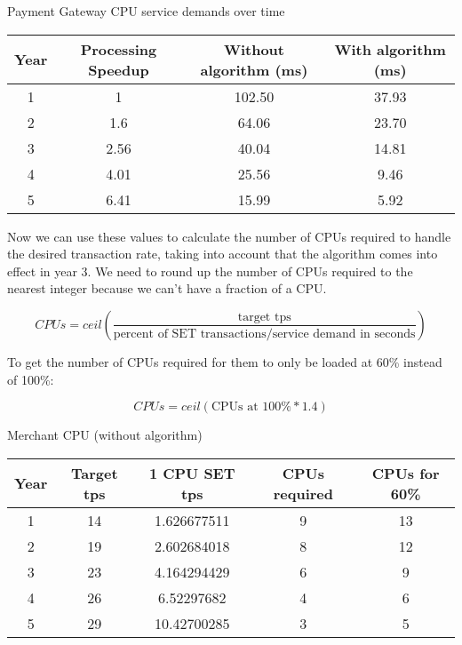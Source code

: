 \begin{center}
  Payment Gateway CPU service demands over time
  \begin{tabular}{ |c|c|c|c| }
    \hline
    Year & Processing Speedup & Without algorithm (ms) & With algorithm (ms) \\
    \hline
    1    & 1                  & 102.50                 & 37.93               \\
    \hline
    2    & 1.6                & 64.06                  & 23.70               \\
    \hline
    3    & 2.56               & 40.04                  & 14.81               \\
    \hline
    4    & 4.01               & 25.56                  & 9.46                \\
    \hline
    5    & 6.41               & 15.99                  & 5.92                \\
    \hline
  \end{tabular}
\end{center}

Now we can use these values to calculate the number of CPUs required to handle the desired transaction rate, taking into account that the algorithm comes into effect in year 3. We need to round up the number of CPUs required to the nearest integer because we can't have a fraction of a CPU.

\begin{equation}
  CPUs = ceil(\frac{\text{target tps}}{\text{percent of SET transactions} / \text{service demand in seconds}})
\end{equation}

To get the number of CPUs required for them to only be loaded at 60\% instead of 100\%:

\begin{equation}
  CPUs = ceil(\text{CPUs at 100\%} * 1.4)
\end{equation}

\begin{center}
  Merchant CPU (without algorithm)
  \begin{tabular}{ |c|c|c|c|c| }
    \hline
    Year & Target tps & 1 CPU SET tps & CPUs required & CPUs for 60\% \\
    \hline
    1    & 14         & 1.626677511   & 9             & 13            \\
    \hline
    2    & 19         & 2.602684018   & 8             & 12            \\
    \hline
    3    & 23         & 4.164294429   & 6             & 9             \\
    \hline
    4    & 26         & 6.52297682    & 4             & 6             \\
    \hline
    5    & 29         & 10.42700285   & 3             & 5             \\
    \hline
  \end{tabular}
\end{center}

